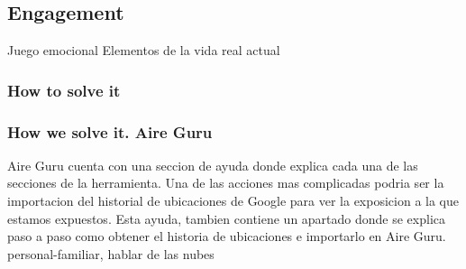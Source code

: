 \subsection{Engagement}
 
Juego emocional
Elementos de la vida real
actual

\subsubsection{How to solve it} 


\subsubsection{How we solve it. Aire Guru} 
Aire Guru cuenta con una seccion de ayuda  donde explica cada una de las secciones de la herramienta. Una de las acciones mas complicadas
podria ser la importacion del historial de ubicaciones de Google para ver la exposicion a la que estamos expuestos. Esta ayuda, tambien 
contiene un apartado donde se explica paso a paso como obtener el historia de ubicaciones e importarlo en Aire Guru.
personal-familiar, hablar de las nubes
\begin{itemize}
    \done
    \crossed
    
\end{itemize}
\newpage
